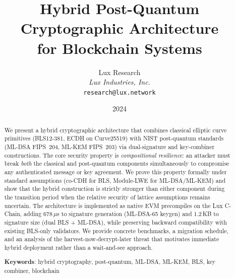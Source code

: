 \documentclass[11pt,a4paper]{article}
\title{\textbf{Hybrid Post-Quantum Cryptographic Architecture\\for Blockchain Systems}}
\author{
Lux Research \\
\textit{Lux Industries, Inc.}\\
\texttt{research@lux.network}
}
\date{2024}
\begin{document}
\luxcoverpage

\begin{abstract}
We present a hybrid cryptographic architecture that combines classical elliptic curve
primitives (BLS12-381, ECDH on Curve25519) with NIST post-quantum standards (ML-DSA
FIPS~204, ML-KEM FIPS~203) via dual-signature and key-combiner constructions. The core
security property is \emph{compositional resilience}: an attacker must break \emph{both}
the classical and post-quantum components simultaneously to compromise any authenticated
message or key agreement. We prove this property formally under standard assumptions
(co-CDH for BLS, Module-LWE for ML-DSA/ML-KEM) and show that the hybrid construction
is strictly stronger than either component during the transition period when the
relative security of lattice assumptions remains uncertain. The architecture is
implemented as native EVM precompiles on the Lux C-Chain, adding 678\,$\mu$s to
signature generation (ML-DSA-65 keygen) and 1.2\,KB to signature size (dual BLS +
ML-DSA), while preserving backward compatibility with existing BLS-only validators.
We provide concrete benchmarks, a migration schedule, and an analysis of the
harvest-now-decrypt-later threat that motivates immediate hybrid deployment rather
than a wait-and-see approach.

\textbf{Keywords}: hybrid cryptography, post-quantum, ML-DSA, ML-KEM, BLS,
key combiner, blockchain
\end{abstract}

\tableofcontents
\newpage










\end{document}
